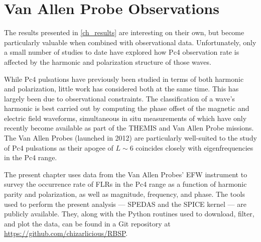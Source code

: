


\chapter{Van Allen Probe Observations}
  \label{ch_rbsp}

The results presented in \cref{ch_results} are interesting on their own, but become particularly valuable when combined with observational data. Unfortunately, only a small number of studies to date have explored how Pc4 observation rate is affected by the harmonic and polarization structure of those waves. 

While Pc4 pulsations have previously been studied in terms of both harmonic\cite{arthur_1981,cummings_1969,engebretson_1988,hughes_1978,singer_1982,takahashi_1984} and polarization\cite{anderson_1990,dai_2015,dai_2013,kokubun_1989,liu_2009}, little work has considered both at the same time. This has largely been due to observational constraints. The classification of a wave's harmonic is best carried out by computing the phase offset of the magnetic and electric field waveforms, simultaneous in situ measurements of which have only recently become available as part of the THEMIS\cite{angelopoulos_2008} and Van Allen Probe\cite{stratton_2012} missions. The Van Allen Probes (launched in 2012) are particularly well-suited to the study of Pc4 pulsations as their apogee of $L \sim 6$ coincides closely with eigenfrequencies in the Pc4 range. 

The present chapter uses data from the Van Allen Probes' EFW instrument\cite{wygant_2013} to survey the occurrence rate of FLRs in the Pc4 range as a function of harmonic parity and polarization, as well as magnitude, frequency, and phase. The tools used to perform the present analysis --- SPEDAS and the SPICE kernel --- are publicly available. They, along with the Python routines used to download, filter, and plot the data, can be found in a Git repository at \url{https://github.com/chizarlicious/RBSP}. 




